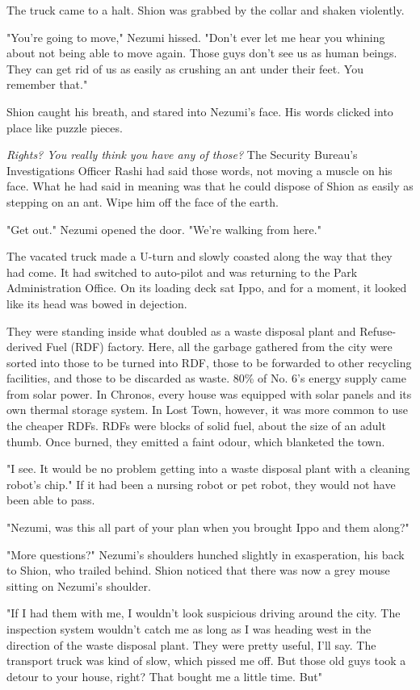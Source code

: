 The truck came to a halt. Shion was grabbed by the collar and shaken
violently.

"You're going to move," Nezumi hissed. "Don't ever let me hear you
whining about not being able to move again. Those guys don't see us as
human beings. They can get rid of us as easily as crushing an ant under
their feet. You remember that."

Shion caught his breath, and stared into Nezumi's face. His words
clicked into place like puzzle pieces.

\emph{Rights? You really think you have any of those?} The Security Bureau's
Investigations Officer Rashi had said those words, not moving a muscle
on his face. What he had said in meaning was that he could dispose of
Shion as easily as stepping on an ant. Wipe him off the face of the
earth.

"Get out." Nezumi opened the door. "We're walking from here."

The vacated truck made a U-turn and slowly coasted along the way that
they had come. It had switched to auto-pilot and was returning to the
Park Administration Office. On its loading deck sat Ippo, and for a
moment, it looked like its head was bowed in dejection.

They were standing inside what doubled as a waste disposal plant and
Refuse-derived Fuel (RDF) factory. Here, all the garbage gathered from
the city were sorted into those to be turned into RDF, those to be
forwarded to other recycling facilities, and those to be discarded as
waste. 80\% of No. 6's energy supply came from solar power. In Chronos,
every house was equipped with solar panels and its own thermal storage
system. In Lost Town, however, it was more common to use the cheaper
RDFs. RDFs were blocks of solid fuel, about the size of an adult thumb.
Once burned, they emitted a faint odour, which blanketed the town.

"I see. It would be no problem getting into a waste disposal plant with
a cleaning robot's chip." If it had been a nursing robot or pet robot,
they would not have been able to pass.

"Nezumi, was this all part of your plan when you brought Ippo and them
along?"

"More questions?" Nezumi's shoulders hunched slightly in exasperation,
his back to Shion, who trailed behind. Shion noticed that there was now
a grey mouse sitting on Nezumi's shoulder.

"If I had them with me, I wouldn't look suspicious driving around the
city. The inspection system wouldn't catch me as long as I was heading
west in the direction of the waste disposal plant. They were pretty
useful, I'll say. The transport truck was kind of slow, which pissed me
off. But those old guys took a detour to your house, right? That bought
me a little time. But\el "

